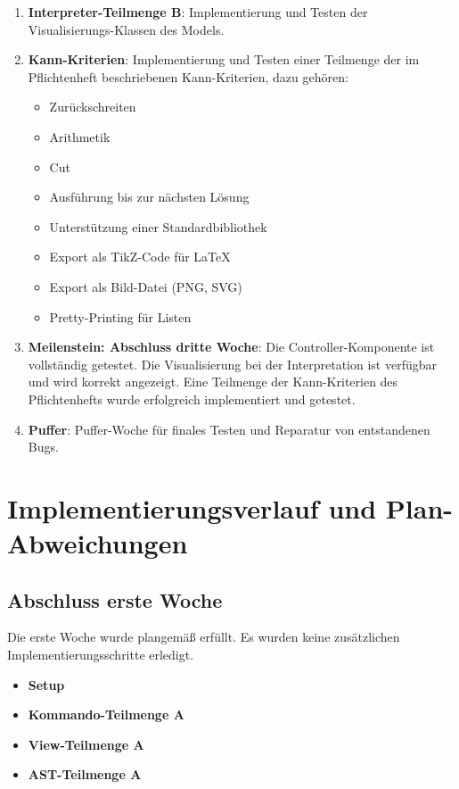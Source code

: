 \documentclass[parskip=full,11pt,twoside]{scrartcl}
\newcommand{\cmark}{\ding{51}}%
\begin{document}
\begin{enumerate}
	\item \textbf{Interpreter-Teilmenge B}: Implementierung und Testen der Visualisierungs-Klassen des Models.
	
	\item \textbf{Kann-Kriterien}: Implementierung und Testen einer Teilmenge der im Pflichtenheft beschriebenen Kann-Kriterien, dazu gehören:
	\begin{multicols}{2}
		\begin{itemize}
			\item Zurückschreiten
			\item Arithmetik
			\item Cut
			\item Ausführung bis zur nächsten Lösung
			\item Unterstützung einer Standardbibliothek
			\item Export als TikZ-Code für LaTeX
			\item Export als Bild-Datei (PNG, SVG)
			\item Pretty-Printing für Listen
		\end{itemize}
	\end{multicols}
	
	\item \textbf{Meilenstein: Abschluss dritte Woche}: Die Controller-Komponente ist vollständig getestet. Die Visualisierung bei der Interpretation ist verfügbar und wird korrekt angezeigt. Eine Teilmenge der Kann-Kriterien des Pflichtenhefts wurde erfolgreich implementiert und getestet.
	
	\item \textbf{Puffer}: Puffer-Woche für finales Testen und Reparatur von entstandenen Bugs.
\end{enumerate}

\section{Implementierungsverlauf und Plan-Abweichungen}

\subsection{Abschluss erste Woche}
Die erste Woche wurde plangemäß erfüllt. Es wurden keine zusätzlichen Implementierungsschritte erledigt.

\begin{itemize}
	\item \textbf{Setup}\hfill\cmark
	\item \textbf{Kommando-Teilmenge A}\hfill\cmark
	\item \textbf{View-Teilmenge A}\hfill\cmark
	\item \textbf{AST-Teilmenge A}\hfill\cmark
\end{itemize}
\end{document}
